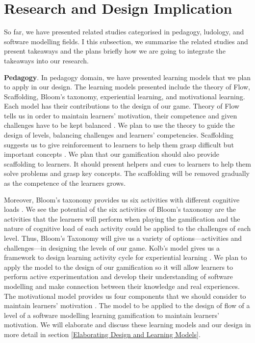 \documentclass[12pt, a4paper]{report}
\begin{document}
{\section{Research and Design Implication}
\label{Research and Design Implication}
So far, we have presented related studies categorised in pedagogy, ludology, and software modelling fields. I this subsection, we summarise the related studies and present takeaways and the plans briefly how we are going to integrate the takeaways into our research.     

\textbf{Pedagogy}. In pedagogy domain, we have presented learning models that we plan to apply in our design. The learning models presented include the theory of Flow, Scaffolding, Bloom's taxonomy, experiential learning, and motivational learning. Each model has their contributions to the design of our game. Theory of Flow tells us in order to maintain learners' motivation, their competence and given challenges have to be kept balanced \cite{csikszentmihalyi2014toward}. We plan to use the theory to guide the design of levels, balancing challenges and learners' competencies. Scaffolding suggests us to give reinforcement to learners to help them grasp difficult but important concepts \cite{wood1976role, vygotsky1978mind}. We plan that our gamification should also provide scaffolding to learners. It should present helpers and cues to learners to help them solve problems and grasp key concepts. The scaffolding will be removed gradually as the competence of the learners grows. 

Moreover, Bloom's taxonomy provides us six activities with different cognitive loads \cite{krathwohl2002revision}. We see the potential of the six activities of Bloom’s taxonomy are the activities that the learners will perform when playing the gamification and the nature of cognitive load of each activity could be applied to the challenges of each level. Thus, Bloom's Taxonomy will give us a variety of options---activities and challenges---in designing the levels of our game. Kolb's model gives us a framework to design learning activity cycle for experiential learning \cite{kolb2014experiential}. We plan to apply the model to the design of our gamification so it will allow learners to perform active experimentation and develop their understanding of software modelling and make connection between their knowledge and real experiences. The motivational model provides us four components that we should consider to maintain learners' motivation \cite{keller2010motivational}. The model to be applied to the design of flow of a level of a software modelling learning gamification to maintain learners' motivation. We will elaborate and discuss these learning models and our design in more detail in section \ref{Elaborating Design and Learning Models}. 

}
\end{document}
